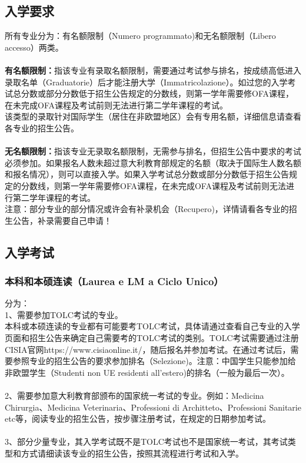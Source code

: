 \subsection{入学要求}
所有专业分为：有名额限制（Numero programmato)和无名额限制（Libero accesso）两类。\\
\\
\textbf{有名额限制：}指该专业有录取名额限制，需要通过考试参与排名，按成绩高低进入录取名单（Graduatorie）后才能注册大学（Immatricolazione）。如过您的入学考试总分数或部分分数低于招生公告规定的分数线，则第一学年需要修OFA课程，在未完成OFA课程及考试前则无法进行第二学年课程的考试。\\
该类型的录取针对国际学生（居住在非欧盟地区）会有专用名额，详细信息请查看各专业的招生公告。\\
\\
\textbf{无名额限制：}指该专业无录取名额限制，无需参与排名，但招生公告中要求的考试必须参加。如果报名人数未超过意大利教育部规定的名额（取决于国际生人数名额和报名情况），则可以直接入学。如果入学考试总分数或部分分数低于招生公告规定的分数线，则第一学年需要修OFA课程，在未完成OFA课程及考试前则无法进行第二学年课程的考试。
\\
注意：部分专业的部分情况或许会有补录机会（Recupero)，详情请看各专业的招生公告，补录需要自己申请！

\subsection{入学考试}

\subsubsection{本科和本硕连读（Laurea e LM a Ciclo Unico）}
分为：\\
1、需要参加TOLC考试的专业。\\
本科或本硕连读的专业都有可能要考TOLC考试，具体请通过查看自己专业的入学页面和招生公告来确定自己需要考的TOLC考试的类别。TOLC考试需要通过注册CISIA官网https://www.cisiaonline.it/，随后报名并参加考试。在通过考试后，需要参照专业的招生公告的要求参加排名（Selezione)。注意：中国学生只能参加给非欧盟学生（Studenti non UE residenti all'estero)的排名（一般为最后一次）。\\
\\
2、需要参加意大利教育部颁布的国家统一考试的专业。例如：Medicina Chirurgia、Medicina Veterinaria、Professioni di Architteto、Professioni Sanitarie etc等，阅读专业的招生公告，按步骤注册考试，在规定的日期参加考试。\\
\\
3、部分少量专业，其入学考试既不是TOLC考试也不是国家统一考试，其考试类型和方式请细读该专业的招生公告，按照其流程进行考试和入学。

